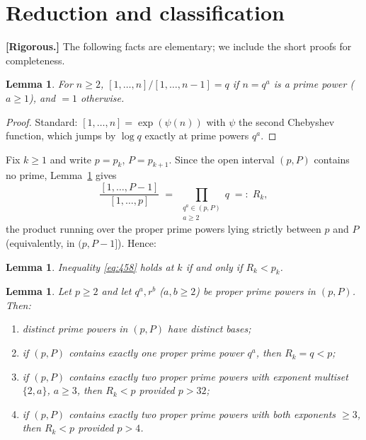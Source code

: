 \documentclass[11pt]{amsart}
\newtheorem{lemma}[theorem]{Lemma}
\theoremstyle{definition}
\theoremstyle{remark}
\begin{document}
\section{Reduction and classification}\label{sec:red}

\textbf{[Rigorous.]} The following facts are elementary; we include the short proofs for completeness.

\begin{lemma}\label{lem:jump}
For $n\ge 2$, $[1,\ldots,n]/[1,\ldots,n-1]=q$ if $n=q^a$ is a prime power ($a\ge1$), and $=1$ otherwise.
\end{lemma}

\begin{proof}
Standard: $[1,\ldots,n]=\exp(\psi(n))$ with $\psi$ the second Chebyshev function, which jumps by $\log q$ exactly at prime powers $q^a$.
\end{proof}

Fix $k\ge1$ and write $p=p_k$, $P=p_{k+1}$. Since the open interval $(p,P)$ contains no prime, Lemma~\ref{lem:jump} gives
\begin{equation}\label{eq:ratio}
\frac{[1,\ldots,P-1]}{[1,\ldots,p]} \;=\; \prod_{\substack{q^a\in(p,P)\\ a\ge 2}} q \;=:\; R_k ,
\end{equation}
the product running over the proper prime powers lying strictly between $p$ and $P$ (equivalently, in $(p, P-1]$). Hence:

\begin{lemma}\label{lem:red}
Inequality \eqref{eq:458} holds at $k$ if and only if $R_k<p_k$.
\end{lemma}

\begin{lemma}\label{lem:basic}
Let $p\ge 2$ and let $q^a, r^b$ ($a,b\ge2$) be proper prime powers in $(p,P)$. Then:
\begin{enumerate}
\item[(i)] distinct prime powers in $(p,P)$ have distinct bases;
\item[(ii)] if $(p,P)$ contains exactly one proper prime power $q^a$, then $R_k=q<p$;
\item[(iii)] if $(p,P)$ contains exactly two proper prime powers with exponent multiset $\{2,a\}$, $a\ge3$, then $R_k<p$ provided $p>32$;
\item[(iv)] if $(p,P)$ contains exactly two proper prime powers with both exponents $\ge3$, then $R_k<p$ provided $p>4$.
\end{enumerate}
\end{lemma}
\end{document}

